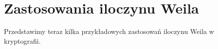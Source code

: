\chapter{Zastosowania iloczynu Weila}

\noindent
Przedstawimy teraz kilka przykładowych zastosowań
iloczynu Weila w kryptografii.






